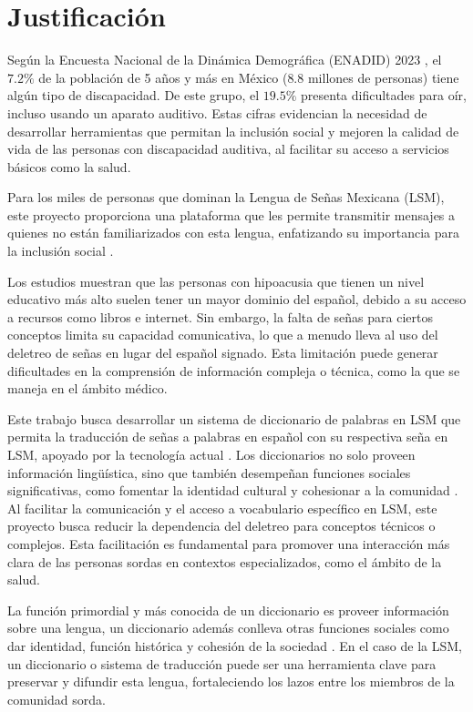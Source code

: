 \section{Justificación}
Según la Encuesta Nacional de la Dinámica Demográfica (ENADID) 2023 \cite{ref41}, el $7.2\%$ de la población de 5 años y más en México ($8.8$ millones de personas) tiene algún tipo de discapacidad. De este grupo, el $19.5\%$ presenta dificultades para oír, incluso usando un aparato auditivo. Estas cifras evidencian la necesidad de desarrollar herramientas que permitan la inclusión social y mejoren la calidad de vida de las personas con discapacidad auditiva, al facilitar su acceso a servicios básicos como la salud.

Para los miles de personas que dominan la Lengua de Señas Mexicana (LSM), este proyecto proporciona una plataforma que les permite transmitir mensajes a quienes no están familiarizados con esta lengua, enfatizando su importancia para la inclusión social \cite{ref16}.

Los estudios muestran que las personas con hipoacusia que tienen un nivel educativo más alto suelen tener un mayor dominio del español, debido a su acceso a recursos como libros e internet. Sin embargo, la falta de señas para ciertos conceptos limita su capacidad comunicativa, lo que a menudo lleva al uso del deletreo de señas en lugar del español signado. Esta limitación puede generar dificultades en la comprensión de información compleja o técnica, como la que se maneja en el ámbito médico.

Este trabajo busca desarrollar un sistema de diccionario de palabras en LSM que permita la traducción de señas a palabras en español con su respectiva seña en LSM, apoyado por la tecnología actual \cite{ref17}. Los diccionarios no solo proveen información lingüística, sino que también desempeñan funciones sociales significativas, como fomentar la identidad cultural y cohesionar a la comunidad \cite{ref18}. Al facilitar la comunicación y el acceso a vocabulario específico en LSM, este proyecto busca reducir la dependencia del deletreo para conceptos técnicos o complejos. Esta facilitación es fundamental para promover una interacción más clara de las personas sordas en contextos especializados, como el ámbito de la salud.

La función primordial y más conocida de un diccionario es proveer información sobre una lengua, un diccionario además conlleva otras funciones sociales como dar identidad, función histórica y cohesión de la sociedad \cite{ref19}. En el caso de la LSM, un diccionario o sistema de traducción puede ser una herramienta clave para preservar y difundir esta lengua, fortaleciendo los lazos entre los miembros de la comunidad sorda.
